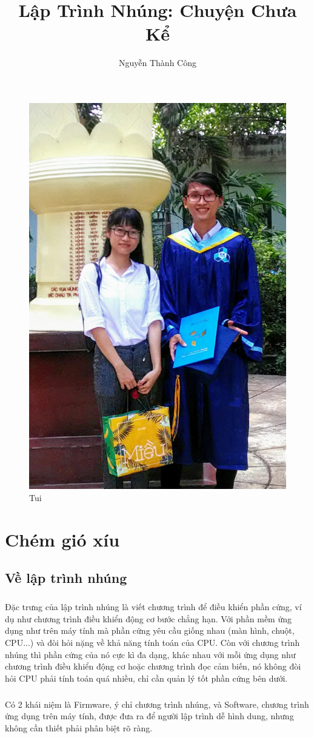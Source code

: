\documentclass[12pt,a5paper]{book}
\title{Lập Trình Nhúng: Chuyện Chưa Kể}
\author{Nguyễn Thành Công}
\begin{document}
\maketitle
\begin{figure}
\centering
 \includegraphics[width=0.5\linewidth]{tao.jpg}
 \caption{Tui}
\end{figure}
\tableofcontents{}
 \chapter{Chém gió xíu }
	\section{Về lập trình nhúng}
		\paragraph{}
Đặc trưng của lập trình nhúng là viết chương trình để điều khiển phần cứng, ví dụ như chương trình điều khiển động cơ bước chẳng hạn. Với phần mềm ứng dụng như trên máy tính mà phần cứng yêu cầu giống nhau (màn hình, chuột, CPU...) và đòi hỏi nặng về khả năng tính toán của CPU. Còn với chương trình nhúng thì phần cứng của nó cực kì đa dạng, khác nhau với mỗi ứng dụng như chương trình điều khiển động cơ hoặc chương trình đọc cảm biến, nó không đòi hỏi CPU phải tính toán quá nhiều, chỉ cần quản lý tốt phần cứng bên dưới. 
		\paragraph{}
Có 2 khái niệm là Firmware, ý chỉ chương trình nhúng, và Software, chương trình ứng dụng trên máy tính, được đưa ra để người lập trình dễ hình dung, nhưng không cần thiết phải phân biệt rõ ràng.
\end{document}
